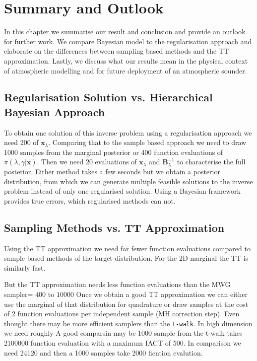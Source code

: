 \chapter{Summary and Outlook}
\label{ch:Concl}
In this chapter we summarise our result and conclusion and provide an outlook for further work.
We compare Bayesian model to the regularisation approach and elaborate on the differences between sampling based methods and the TT approximation.
Lastly, we discuss what our results mean in the physical context of atmospheric modelling and for future deployment of an atmospheric sounder.


\section{Regularisation Solution vs. Hierarchical Bayesian Approach}
To obtain one solution of this inverse problem using a regularisation approach we need 200 of $\bm{x}_{\lambda}$.
Comparing that to the sample based approach we need to draw 1000 samples from the marginal posterior or 400 function evaluations of $\pi(\lambda, \gamma | \bm{x})$.
Then we need 20  evaluations of $\bm{x}_{\lambda}$ and $\bm{B}^{-1}_{\lambda}$ to characterise the full posterior.
Either method takes a few seconds but we obtain a posterior distribution, from which we can generate multiple feasible solutions to the inverse problem instead of only one regularised solution.
Using a Bayesian framework provides true errors, which regularised methods can not.


\section{Sampling Methods vs. TT Approximation}

Using the TT approximation we need far fewer function evaluations compared to sample based methods of the target distribution.
For the 2D marginal the TT is similarly fast.

But the TT approximation needs less function evaluations than the MWG sampler= $400$ to $10000$
Once we obtain a good TT approximation we can either use the marginal of that distribution for quadrature or draw samples at the cost of 2 function evaluations per independent sample (MH correction step).
Even thought there may be more efficient samplers than the \texttt{t-walk}.
In high dimension we need roughly
A good comparsin may be 1000 sample from the t-walk takes 2100000 function evaluation with a maximum IACT of 500.
In comparison we need  24120 and then a 1000 samples take 2000 ficntion evalution.

